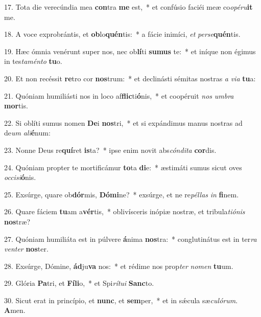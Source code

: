 17. Tota die verecúndia mea \textbf{con}tra \textbf{me} est,~*  et confúsio faciéi meæ co\textit{o}\textit{pé}\textit{ru}\textbf{it} me.\

18. A voce exprobrántis, et \textbf{ob}lo\textbf{quén}tis:~*  a fácie inimíci, \textit{et} \textit{per}\textit{se}\textbf{quén}tis.\

19. Hæc ómnia venérunt super nos, nec ob\textbf{lí}ti \textbf{su}\textbf{mus} te:~*  et iníque non égimus in tes\textit{ta}\textit{mén}\textit{to} \textbf{tu}o.\

20. Et non recéssit \textbf{re}tro cor \textbf{nos}trum:~*  et declinásti sémitas nostras \textit{a} \textit{vi}\textit{a} \textbf{tu}a:\

21. Quóniam humiliásti nos in loco af\textbf{flic}ti\textbf{ó}nis,~*  et coopéruit \textit{nos} \textit{um}\textit{bra} \textbf{mor}tis.\

22. Si oblíti sumus nomen \textbf{De}i \textbf{nos}tri,~*  et si expándimus manus nostras ad de\textit{um} \textit{a}\textit{li}\textbf{é}num:\

23. Nonne Deus re\textbf{quí}ret \textbf{is}ta?~*  ipse enim novit abs\textit{cón}\textit{di}\textit{ta} \textbf{cor}dis.\

24. Quóniam propter te mortificámur \textbf{to}ta \textbf{di}e:~*  æstimáti sumus sicut oves \textit{oc}\textit{ci}\textit{si}\textbf{ó}nis.\

25. Exsúrge, quare ob\textbf{dór}mis, \textbf{Dó}\textbf{mi}ne?~*  exsúrge, et ne re\textit{pél}\textit{las} \textit{in} \textbf{fi}nem.\

26. Quare fáciem \textbf{tu}am a\textbf{vér}tis,~*  oblivísceris inópiæ nostræ, et tribula\textit{ti}\textit{ó}\textit{nis} \textbf{nos}træ?\

27. Quóniam humiliáta est in púlvere \textbf{á}nima \textbf{nos}tra:~*  conglutinátus est in ter\textit{ra} \textit{ven}\textit{ter} \textbf{nos}ter.\

28. Exsúrge, Dómine, \textbf{ád}ju\textbf{va} nos:~*  et rédime nos prop\textit{ter} \textit{no}\textit{men} \textbf{tu}um.\

29. Glória \textbf{Pa}tri, et \textbf{Fí}\textbf{li}o,~*  et Spi\textit{rí}\textit{tu}\textit{i} \textbf{Sanc}to.\

30. Sicut erat in princípio, et \textbf{nunc}, et \textbf{sem}per,~*  et in sǽcula sæ\textit{cu}\textit{ló}\textit{rum}. \textbf{A}men.\

